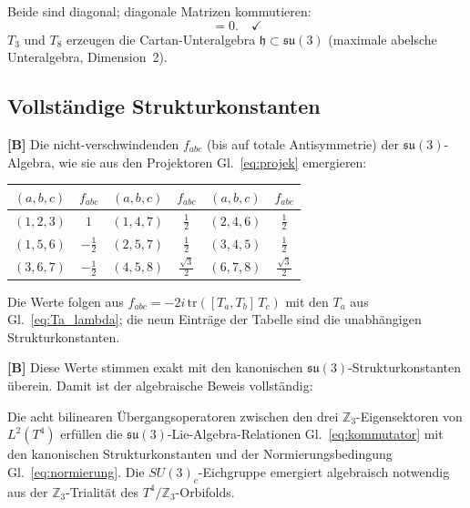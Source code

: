 Beide sind diagonal; diagonale Matrizen kommutieren:
\begin{equation}
  [T_3, T_8] = 0.\quad\checkmark
  \label{eq:komm_38}
\end{equation}
$T_3$ und $T_8$ erzeugen die Cartan-Unteralgebra
$\mathfrak{h} \subset \mathfrak{su}(3)$ (maximale abelsche Unteralgebra,
Dimension~2).

\subsection{Vollständige Strukturkonstanten}

\textbf{[B]} Die nicht-verschwindenden $f_{abc}$ (bis auf totale
Antisymmetrie) der $\mathfrak{su}(3)$-Algebra, wie sie aus den
Projektoren Gl.~\eqref{eq:projek} emergieren:

\begin{center}
\begin{tabular}{cc|cc|cc}
\toprule
$(a,b,c)$ & $f_{abc}$ & $(a,b,c)$ & $f_{abc}$ &
$(a,b,c)$ & $f_{abc}$ \\
\midrule
$(1,2,3)$ & $1$   & $(1,4,7)$ & $\frac{1}{2}$ & $(2,4,6)$ & $\frac{1}{2}$ \\
$(1,5,6)$ & $-\frac{1}{2}$ & $(2,5,7)$ & $\frac{1}{2}$ &
$(3,4,5)$ & $\frac{1}{2}$ \\
$(3,6,7)$ & $-\frac{1}{2}$ & $(4,5,8)$ & $\frac{\sqrt{3}}{2}$ &
$(6,7,8)$ & $\frac{\sqrt{3}}{2}$ \\
\bottomrule
\end{tabular}
\end{center}
Die Werte folgen aus $f_{abc}=-2i\,\mathrm{tr}([T_a,T_b]\,T_c)$ mit den
$T_a$ aus Gl.~\eqref{eq:Ta_lambda}; die neun Einträge der Tabelle sind
die unabhängigen Strukturkonstanten.

\textbf{[B]} Diese Werte stimmen exakt mit den kanonischen
$\mathfrak{su}(3)$-Strukturkonstanten überein. Damit ist der
algebraische Beweis vollständig:

\begin{keyresult}
Die acht bilinearen Übergangsoperatoren zwischen den drei
$\mathbb{Z}_3$-Eigensektoren von $L^2(T^4)$ erfüllen die
$\mathfrak{su}(3)$-Lie-Algebra-Relationen Gl.~\eqref{eq:kommutator}
mit den kanonischen Strukturkonstanten und der
Normierungsbedingung Gl.~\eqref{eq:normierung}.
Die $SU(3)_c$-Eichgruppe emergiert algebraisch notwendig aus der
$\mathbb{Z}_3$-Trialität des $T^4/\mathbb{Z}_3$-Orbifolds.
\end{keyresult}

